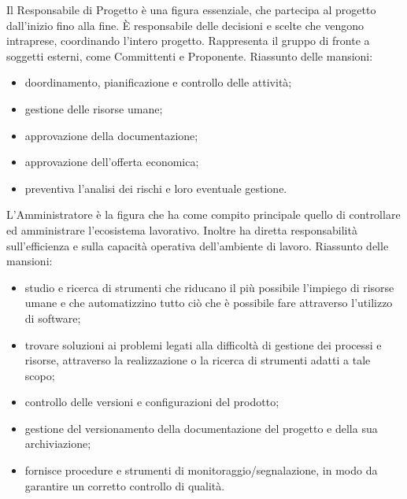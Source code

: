 			Il Responsabile di Progetto è una figura essenziale, che partecipa al progetto dall'inizio fino alla fine. È responsabile delle decisioni e scelte che vengono intraprese, coordinando l'intero progetto. Rappresenta il gruppo di fronte a soggetti esterni, come Committenti e Proponente.
			Riassunto delle mansioni:
			\begin{itemize}
				\item doordinamento, pianificazione e controllo delle attività;
				\item gestione delle risorse umane;
				\item approvazione della documentazione;
				\item approvazione dell'offerta economica;
				\item preventiva l'analisi dei rischi e loro eventuale gestione.
			\end{itemize}
			
			L'Amministratore è la figura che ha come compito principale quello di controllare ed amministrare l'ecosistema lavorativo. Inoltre ha diretta responsabilità sull'efficienza e sulla capacità operativa dell'ambiente di lavoro.
			Riassunto delle mansioni:
			\begin{itemize}
				\item studio e ricerca di strumenti che riducano il più possibile l'impiego di risorse umane e che automatizzino tutto ciò che è possibile fare attraverso l'utilizzo di software;
				\item trovare soluzioni ai problemi legati alla difficoltà di gestione dei processi e risorse, attraverso la realizzazione o la ricerca di strumenti adatti a tale scopo;
				\item controllo delle versioni e configurazioni del prodotto;
				\item gestione del versionamento della documentazione del progetto e della sua archiviazione;
				\item fornisce procedure e strumenti di monitoraggio/segnalazione, in modo da garantire un corretto controllo di qualità.
			\end{itemize}
		
